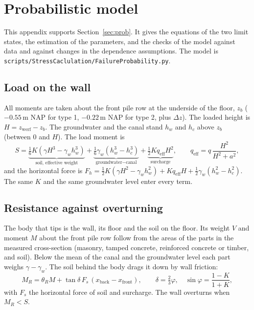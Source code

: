 
\section{Probabilistic model}\label{app:prob}

This appendix supports Section~\ref{sec:prob}. It gives the equations of the
two limit states, the estimation of the parameters, and the checks of the
model against data and against changes in the dependence assumptions. The
model is \texttt{scripts/StressCaclulation/FailureProbability.py}.

\subsection{Load on the wall}\label{app:prob-load}

All moments are taken about the front pile row at the underside of the floor,
$z_b$ ($-0.55$\,m NAP for type 1, $-0.22$\,m NAP for type 2, plus $\Delta z$).
The loaded height is $H = z_\text{werf} - z_b$. The groundwater and the canal
stand $h_w$ and $h_c$ above $z_b$ (between 0 and $H$). The load moment is
\begin{equation}
S = \underbrace{\tfrac{1}{6}K\left(\gamma H^3 - \gamma_w h_w^3\right)}_{\text{soil, effective weight}}
  + \underbrace{\tfrac{1}{6}\gamma_w\left(h_w^3 - h_c^3\right)}_{\text{groundwater} - \text{canal}}
  + \underbrace{\tfrac{1}{2}K q_\text{eff} H^2}_{\text{surcharge}},
\qquad q_\text{eff} = q\,\frac{H^2}{H^2 + a^2},
\label{eq:app-load}
\end{equation}
and the horizontal force is
$F_h = \tfrac12 K(\gamma H^2 - \gamma_w h_w^2) + K q_\text{eff} H
+ \tfrac12\gamma_w(h_w^2 - h_c^2)$. The same $K$ and the same groundwater
level enter every term.

\subsection{Resistance against overturning}\label{app:prob-resistance}

The body that tips is the wall, its floor and the soil on the floor. Its
weight $V$ and moment $M$ about the front pile row follow from the areas of the
parts in the measured cross-section (masonry, tamped concrete, reinforced
concrete or timber, and soil). Below the mean of the canal and the groundwater
level each part weighs $\gamma - \gamma_w$. The soil behind the body drags it
down by wall friction:
\begin{equation}
M_R = \theta_R M + \tan\delta\,F_s\,(x_\text{back} - x_\text{front}),
\qquad \delta = \tfrac23\varphi, \quad \sin\varphi = \frac{1-K}{1+K},
\end{equation}
with $F_s$ the horizontal force of soil and surcharge. The wall overturns when
$M_R < S$.


